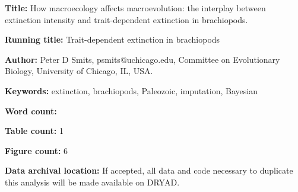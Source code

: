\documentclass{article}
\begin{document}
\linenumbers
\modulolinenumbers[2]


\begin{titlepage}
  \begin{large}
    \textbf{Title:} How macroecology affects macroevolution: the interplay between extinction intensity and trait-dependent extinction in brachiopods.
  \end{large}

  \textbf{Running title:} Trait-dependent extinction in brachiopods

  \textbf{Author:} Peter D Smits, psmits@uchicago.edu, Committee on Evolutionary Biology, University of Chicago, IL, USA.

  \textbf{Keywords:} extinction, brachiopods, Paleozoic, imputation, Bayesian

  \textbf{Word count:} 
  
  \textbf{Table count:} 1
 
  \textbf{Figure count:} 6

  \textbf{Data archival location:} If accepted, all data and code necessary to duplicate this analysis will be made available on DRYAD.

\end{titlepage}
\end{document}
